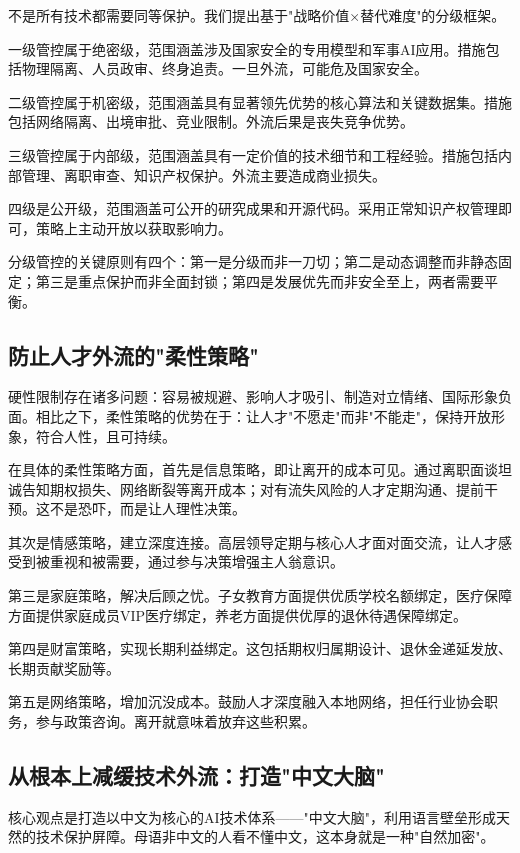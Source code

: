 不是所有技术都需要同等保护。我们提出基于"战略价值×替代难度"的分级框架。

一级管控属于绝密级，范围涵盖涉及国家安全的专用模型和军事AI应用。措施包括物理隔离、人员政审、终身追责。一旦外流，可能危及国家安全。

二级管控属于机密级，范围涵盖具有显著领先优势的核心算法和关键数据集。措施包括网络隔离、出境审批、竞业限制。外流后果是丧失竞争优势。

三级管控属于内部级，范围涵盖具有一定价值的技术细节和工程经验。措施包括内部管理、离职审查、知识产权保护。外流主要造成商业损失。

四级是公开级，范围涵盖可公开的研究成果和开源代码。采用正常知识产权管理即可，策略上主动开放以获取影响力。

分级管控的关键原则有四个：第一是分级而非一刀切；第二是动态调整而非静态固定；第三是重点保护而非全面封锁；第四是发展优先而非安全至上，两者需要平衡。

\subsection{防止人才外流的"柔性策略"}

硬性限制存在诸多问题：容易被规避、影响人才吸引、制造对立情绪、国际形象负面。相比之下，柔性策略的优势在于：让人才"不愿走"而非"不能走"，保持开放形象，符合人性，且可持续。

在具体的柔性策略方面，首先是信息策略，即让离开的成本可见。通过离职面谈坦诚告知期权损失、网络断裂等离开成本；对有流失风险的人才定期沟通、提前干预。这不是恐吓，而是让人理性决策。

其次是情感策略，建立深度连接。高层领导定期与核心人才面对面交流，让人才感受到被重视和被需要，通过参与决策增强主人翁意识。

第三是家庭策略，解决后顾之忧。子女教育方面提供优质学校名额绑定，医疗保障方面提供家庭成员VIP医疗绑定，养老方面提供优厚的退休待遇保障绑定。

第四是财富策略，实现长期利益绑定。这包括期权归属期设计、退休金递延发放、长期贡献奖励等。

第五是网络策略，增加沉没成本。鼓励人才深度融入本地网络，担任行业协会职务，参与政策咨询。离开就意味着放弃这些积累。

\subsection{从根本上减缓技术外流：打造"中文大脑"}

核心观点是打造以中文为核心的AI技术体系——"中文大脑"，利用语言壁垒形成天然的技术保护屏障。母语非中文的人看不懂中文，这本身就是一种"自然加密"。

